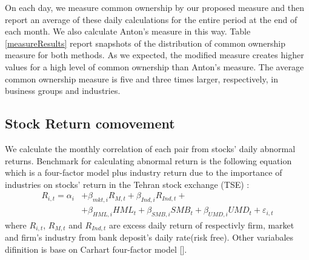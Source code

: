 On each day, we measure common ownership by our proposed measure and then report an average of these daily calculations for the entire period at the end of each month. We also calculate Anton's measure in this way. Table \ref{measureResults} report snapshots of the distribution of common ownership measure for both methods. As we expected, the modified measure creates higher values for a high level of common ownership than Anton's measure. The average common ownership measure is five and three times larger, respectively, in business groups and industries.
%		
		
\FloatBarrier
\subsection{{Stock Return comovement}}
\label{comovement}

	We calculate the monthly correlation of each pair from stocks' daily abnormal returns. Benchmark for calculating abnormal return is the following equation which is a four-factor model plus industry return due to the importance of industries on stocks' return in the Tehran stock exchange (TSE) :
	\begin{equation}
		\begin{split}
			R_{i,t} =\alpha _{i}&+\beta _{mkt,i}{\mathit {R}}_{M,t} + \beta_{Ind,i}{\mathit {R}}_{Ind,t} + \\
			&+\beta _{HML,i}{\mathit {HML}}_{t}+\beta _{SMB,i}{\mathit {SMB}}_{t}+\beta _{UMD,i}{\mathit {UMD}}_{t}+ \varepsilon_{i,t}
		\end{split}
		\label{e5Factor}
	\end{equation}
	where $ R_{i,t} $, $ R_{M,t} $ and $ R_{Ind,t} $ are excess daily return of respectivly  firm, market and firm's industry from bank deposit's daily rate(risk free). Other variabales difinition is base on Carhart four-factor model [\cite{Carhart4Factor}].
	
